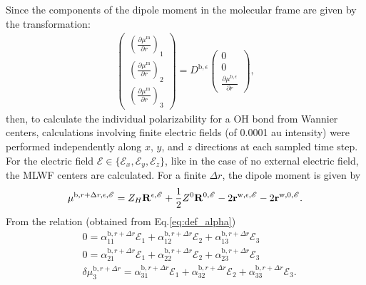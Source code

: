         Since the components of the dipole moment in the molecular frame are given by the transformation:
        \begin{subequations}
          \begin{align}
            \left(
            \begin{matrix}
              (\frac{\partial \mu^\text{m}}{\partial r})_1\\
              (\frac{\partial \mu^\text{m}}{\partial r})_2\\
              (\frac{\partial \mu^\text{m}}{\partial r})_3
            \end{matrix}
            \right)
            = {D}^{\text{b},\epsilon}
            \left(
            \begin{matrix}
              0\\
              0\\
              \frac{\partial \mu^{\text{b},\epsilon}}{\partial r}
            \end{matrix}
            \right),
            \end{align}
        \end{subequations}
    then, to calculate the individual polarizability for a OH bond from Wannier centers, 
    calculations involving finite electric fields (of 0.0001 au intensity) were performed independently 
    along $x$, $y$, and $z$ directions at each sampled time step\cite{Sulpizi2013}.
    For the electric field $\mathscr{E} \in \{\mathscr{E}_x,\mathscr{E}_y, \mathscr{E}_z\}$,
       like in the case of no external electric field, the MLWF centers are calculated. %
 For a finite $\Delta r$, the dipole moment is given by 
\begin{equation}
  \mu^{{\text b},r+\Delta r,\epsilon,\mathscr{E}} = Z_H{\bf R}^{\epsilon,\mathscr{E}} + 
  \frac{1}{2}Z^0 {\bf R}^{0,\mathscr{E}} -2 {\bf r}^{\text{w},\epsilon,\mathscr{E}} -2{\bf r}^{\text{w},0,\mathscr{E}}.
\end{equation}
From the relation (obtained from Eq.\thinspace\ref{eq:def_alpha})
      \begin{subequations}
          \begin{align}
            & 0 = \alpha^{{\text{b}},r+\Delta r}_{11}\mathscr{E}_{1} + \alpha^{{\text{b}},r+\Delta r}_{12}\mathscr{E}_{2} + \alpha^{{\text{b}},r+\Delta r}_{13}\mathscr{E}_{3}\\
            & 0 = \alpha^{{\text{b}},r+\Delta r}_{21}\mathscr{E}_{1} + \alpha^{{\text{b}},r+\Delta r}_{22}\mathscr{E}_{2} + \alpha^{{\text{b}},r+\Delta r}_{23}\mathscr{E}_{3}\\
            & \delta \mu^{{\text{b}},r+\Delta r}_{3} = \alpha^{{\text{b}},r+\Delta r}_{31}\mathscr{E}_{1} + \alpha^{{\text{b}},r+\Delta r}_{32}\mathscr{E}_{2} + \alpha^{{\text{b}},r+\Delta r}_{33}\mathscr{E}_{3}.
          \end{align}
      \end{subequations}
